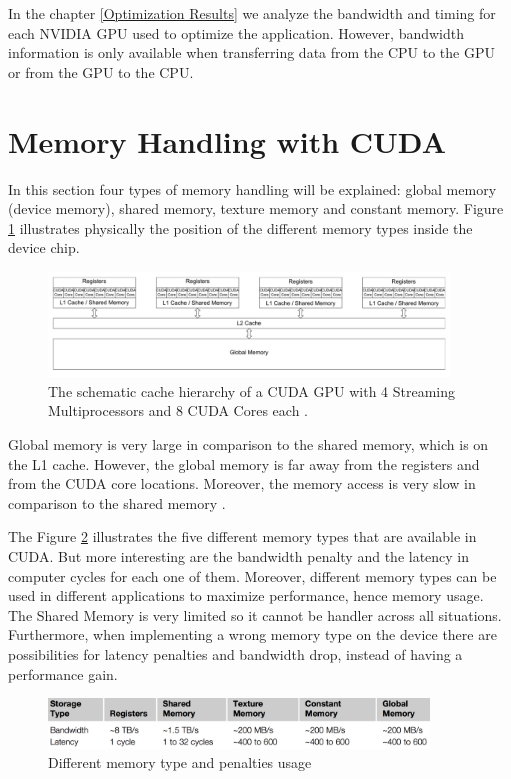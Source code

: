  In the chapter \ref{Optimization Results} we analyze the bandwidth and timing for each NVIDIA GPU used to optimize the application. However, bandwidth information is only available when transferring data from the CPU to the GPU or from the GPU to the CPU.

\section{Memory Handling with CUDA}

In this section four types of memory handling will be explained: global memory (device memory), shared memory, texture memory and constant memory. Figure \ref{fig:cores} illustrates physically the position of the different memory types inside the device chip.

\begin{figure}[htbp]
	\centering
		\includegraphics[width=0.95\textwidth]{Figures/cores.png}
		\smallskip
	\caption[Schematic cache hierarchy of a CUDA GPU]{The schematic cache hierarchy of a CUDA GPU with 4 Streaming Multiprocessors and 8 CUDA Cores each \cite{cook}.}
	\label{fig:cores}
\end{figure}

Global memory is very large in comparison to the shared memory, which is on the L1 cache. However, the global memory is far away from the registers and from the CUDA core locations. Moreover, the memory access is very slow in comparison to the shared memory \cite{cook}.

The Figure \ref{fig:memory} illustrates the five different memory types that are available in CUDA. But more interesting are the bandwidth penalty and the latency in computer cycles for each one of them. Moreover, different memory types can be used in different applications to maximize performance, hence memory usage. The Shared Memory is very limited so it cannot be handler across all situations. Furthermore, when implementing a wrong memory type on the device there are possibilities for latency penalties and bandwidth drop, instead of having a performance gain.
 
\begin{figure}[htbp]
	\centering
		\includegraphics[width=0.9\textwidth]{Figures/memory.png}
		\smallskip
	\caption[Different memory types]{Different memory type and penalties usage \cite{cook}}
	\label{fig:memory}
\end{figure}

